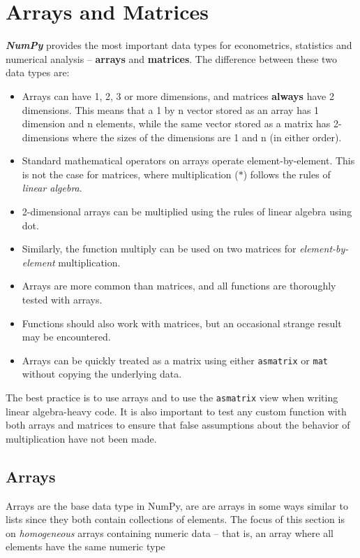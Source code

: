 \documentclass[KSmain.tex]{subfiles}
\begin{document}
 
\section{Arrays and Matrices}
\textit{\textbf{NumPy}} provides the most important data types for econometrics, statistics and numerical analysis – \textbf{arrays}
and \textbf{matrices}. The difference between these two data types are:
\begin{itemize}
\item Arrays can have 1, 2, 3 or more dimensions, and matrices \textbf{always} have 2 dimensions. This means
that a 1 by n vector stored as an array has 1 dimension and n elements, while the same vector stored
as a matrix has 2-dimensions where the sizes of the dimensions are 1 and n (in either order).
\item  Standard mathematical operators on arrays operate element-by-element. This is not the case for
matrices, where multiplication ($\ast$) follows the rules of \textit{linear algebra}.
\item 2-dimensional arrays can be
multiplied using the rules of linear algebra using dot. 
\item Similarly, the function multiply can be used
on two matrices for \textit{element-by-element} multiplication.
\item  Arrays are more common than matrices, and all functions are thoroughly tested with arrays. 
\item Functions
should also work with matrices, but an occasional strange result may be encountered.
\item  Arrays can be quickly treated as a matrix using either \texttt{asmatrix} or \texttt{mat} without copying the underlying
data.
\end{itemize}
The best practice is to use arrays and to use the \texttt{asmatrix} view when writing linear algebra-heavy code. It is
also important to test any custom function with both arrays and matrices to ensure that false assumptions
about the behavior of multiplication have not been made.

\subsection{Arrays}
Arrays are the base data type in NumPy, are are arrays in some ways similar to lists since they both contain
collections of elements. The focus of this section is on \textit{homogeneous} arrays containing numeric data
– that is, an array where all elements have the same numeric type
\end{document}
